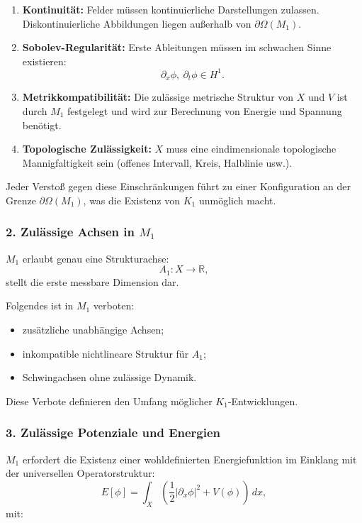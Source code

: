 \begin{enumerate}
    \item \textbf{Kontinuität:}
    Felder müssen kontinuierliche Darstellungen zulassen. Diskontinuierliche Abbildungen liegen außerhalb von $\partial\Omega(M_1)$.

    \item \textbf{Sobolev-Regularität:}
    Erste Ableitungen müssen im schwachen Sinne existieren:
    \[
    \partial_x \phi,\ \partial_t \phi \in H^1.
    \]

    \item \textbf{Metrikkompatibilität:}
    Die zulässige metrische Struktur von $X$ und $V$ ist durch $M_1$ festgelegt und wird zur Berechnung von Energie und Spannung benötigt.

    \item \textbf{Topologische Zulässigkeit:}
    $X$ muss eine eindimensionale topologische Mannigfaltigkeit sein
    (offenes Intervall, Kreis, Halblinie usw.).
\end{enumerate}

Jeder Verstoß gegen diese Einschränkungen führt zu einer Konfiguration an der Grenze
$\partial\Omega(M_1)$, was die Existenz von $K_1$ unmöglich macht.

\subsubsection*{2. Zulässige Achsen in \texorpdfstring{$M_1$}{M_1}}

$M_1$ erlaubt genau eine Strukturachse:
\[
A_1 : X \to \mathbb{R},
\]
stellt die erste messbare Dimension dar.

Folgendes ist in $M_1$ verboten:

\begin{itemize}
    \item zusätzliche unabhängige Achsen;
    \item inkompatible nichtlineare Struktur für $A_1$;
    \item Schwingachsen ohne zulässige Dynamik.
\end{itemize}

Diese Verbote definieren den Umfang möglicher $K_1$-Entwicklungen.

\subsubsection*{3. Zulässige Potenziale und Energien}

$M_1$ erfordert die Existenz einer wohldefinierten Energiefunktion
im Einklang mit der universellen Operatorstruktur:
\[
E[\phi] = \int_X \left(
\frac{1}{2} |\partial_x \phi|^2 + V(\phi)
\right)\,dx,
\]
mit:

